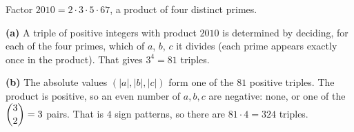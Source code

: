 Factor $2010=2\cdot3\cdot5\cdot67$, a product of four distinct primes.

\textbf{(a)} A triple of positive integers with product $2010$ is determined by deciding, for each of the four primes, which of $a$, $b$, $c$ it divides (each prime appears exactly once in the product). That gives $3^4=\boxed{81}$ triples.

\textbf{(b)} The absolute values $(|a|,|b|,|c|)$ form one of the $81$ positive triples. The product is positive, so an even number of $a,b,c$ are negative: none, or one of the $\dbinom32=3$ pairs. That is $4$ sign patterns, so there are $81\cdot4=\boxed{324}$ triples.
